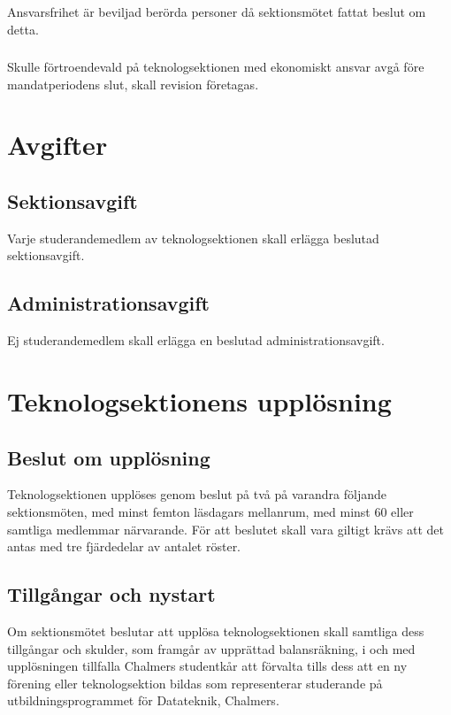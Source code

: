 \documentclass[a4paper]{dtek}
\begin{document}
\subsubsection{}
Ansvarsfrihet är beviljad berörda personer då sektionsmötet fattat beslut om detta.
\subsubsection{}
Skulle förtroendevald på teknologsektionen med ekonomiskt ansvar avgå före mandatperiodens slut, skall revision företagas.
\newpage

\section{Avgifter}
\subsection{Sektionsavgift}
Varje studerandemedlem av teknologsektionen skall erlägga beslutad sektionsavgift.
\subsection{Administrationsavgift}
Ej studerandemedlem skall erlägga en beslutad administrationsavgift.
\newpage

\section{Teknologsektionens upplösning}
\subsection{Beslut om upplösning}
Teknologsektionen upplöses genom beslut på två på varandra följande sektionsmöten, med minst femton läsdagars mellanrum, med minst 60 eller samtliga medlemmar närvarande. För att beslutet skall vara giltigt krävs att det antas med tre fjärdedelar av antalet röster.
\subsection{Tillgångar och nystart}
Om sektionsmötet beslutar att upplösa teknologsektionen skall samtliga dess tillgångar och skulder, som framgår av upprättad balansräkning, i och med upplösningen tillfalla Chalmers studentkår att förvalta tills dess att en ny förening eller teknologsektion bildas som representerar studerande på utbildningsprogrammet för Datateknik, Chalmers.
\newpage
\end{document}
